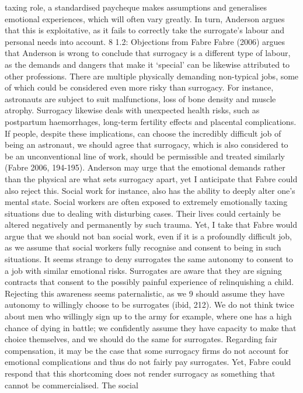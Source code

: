 taxing role, a standardised paycheque makes assumptions and generalises
emotional experiences, which will often vary greatly. In turn, Anderson
argues that this is exploitative, as it fails to correctly take the
surrogate's labour and personal needs into account. 8 1.2: Objections
from Fabre Fabre (2006) argues that Anderson is wrong to conclude that
surrogacy is a different type of labour, as the demands and dangers that
make it `special' can be likewise attributed to other professions. There
are multiple physically demanding non-typical jobs, some of which could
be considered even more risky than surrogacy. For instance, astronauts
are subject to suit malfunctions, loss of bone density and muscle
atrophy. Surrogacy likewise deals with unexpected health risks, such as
postpartum haemorrhages, long-term fertility effects and placental
complications. If people, despite these implications, can choose the
incredibly difficult job of being an astronaut, we should agree that
surrogacy, which is also considered to be an unconventional line of
work, should be permissible and treated similarly (Fabre 2006, 194-195).
Anderson may urge that the emotional demands rather than the physical
are what sets surrogacy apart, yet I anticipate that Fabre could also
reject this. Social work for instance, also has the ability to deeply
alter one's mental state. Social workers are often exposed to extremely
emotionally taxing situations due to dealing with disturbing cases.
Their lives could certainly be altered negatively and permanently by
such trauma. Yet, I take that Fabre would argue that we should not ban
social work, even if it is a profoundly difficult job, as we assume that
social workers fully recognise and consent to being in such situations.
It seems strange to deny surrogates the same autonomy to consent to a
job with similar emotional risks. Surrogates are aware that they are
signing contracts that consent to the possibly painful experience of
relinquishing a child. Rejecting this awareness seems paternalistic, as
we 9 should assume they have autonomy to willingly choose to be
surrogates (ibid, 212). We do not think twice about men who willingly
sign up to the army for example, where one has a high chance of dying in
battle; we confidently assume they have capacity to make that choice
themselves, and we should do the same for surrogates. Regarding fair
compensation, it may be the case that some surrogacy firms do not
account for emotional complications and thus do not fairly pay
surrogates. Yet, Fabre could respond that this shortcoming does not
render surrogacy as something that cannot be commercialised. The social
